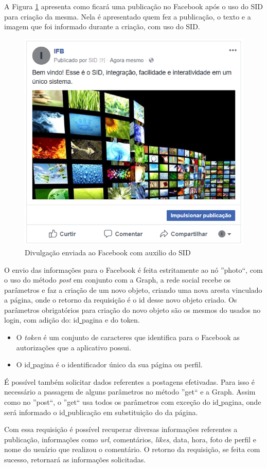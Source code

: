 A Figura \ref{fig:imgfacebook1} apresenta como ficará uma publicação no Facebook após o uso do SID para criação da mesma. Nela é apresentado quem fez a publicação, o texto e a imagem que foi informado durante a criação, com uso do SID.

\begin{figure}[H]
\centering
\includegraphics[scale=1]{figuras/imgfacebook1}
\caption{Divulgação enviada ao Facebook com auxilio do SID}
\label{fig:imgfacebook1}
\end{figure}

O envio das informações para o Facebook é feita estritamente ao nó ''photo``, com o uso do método \textit{post} em conjunto com a Graph, a rede social recebe os parâmetros e faz a criação de um novo objeto, criando uma nova aresta vinculado a página, onde o retorno da requisição é o id desse novo objeto criado. Os parâmetros obrigatórios para criação do novo objeto são os mesmos do usados no login, com adição do: id\underline{{ }}pagina e do token. 

\begin{itemize}
\item O \textit{token} é um conjunto de caracteres que identifica para o Facebook as autorizações que a aplicativo possui.

\item O id\underline{{ }}pagina é o identificador único da sua página ou perfil.
\end{itemize}

É possível também solicitar dados referentes a postagens efetivadas. Para isso é necessário a passagem de alguns parâmetros no método ''get`` e a Graph. Assim como no ''post``, o ''get`` usa todos os parâmetros com exceção do id\underline{{ }}pagina, onde será informado o id\underline{{ }}publicação em substituição do da página.

Com essa requisição é possível recuperar diversas informações referentes a publicação, informações como \textit{url}, comentários, \textit{likes}, data, hora, foto de perfil e nome do usuário que realizou o comentário. O retorno da requisição, se feita com sucesso, retornará as informações solicitadas.